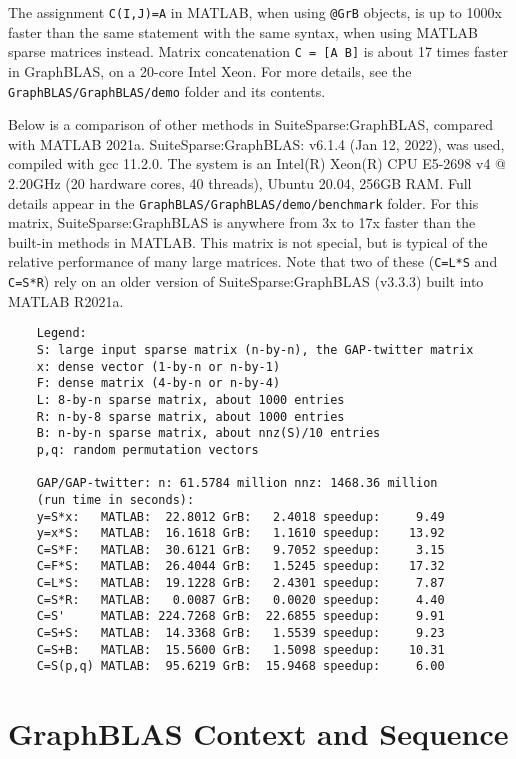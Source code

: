 \documentclass[12pt]{article}
\begin{document}
The assignment \verb'C(I,J)=A' in MATLAB, when using \verb'@GrB' objects, is up
to 1000x faster than the same statement with the same syntax, when using MATLAB
sparse matrices instead.  Matrix concatenation \verb'C = [A B]' is about 17
times faster in GraphBLAS, on a 20-core Intel Xeon.  For more details, see the
\verb'GraphBLAS/GraphBLAS/demo' folder and its contents.

Below is a comparison of other methods in SuiteSparse:GraphBLAS, compared with
MATLAB 2021a.  SuiteSparse:GraphBLAS: v6.1.4 (Jan 12, 2022), was used, compiled
with gcc 11.2.0.  The system is an Intel(R) Xeon(R) CPU E5-2698 v4 @ 2.20GHz
(20 hardware cores, 40 threads), Ubuntu 20.04, 256GB RAM.  Full details appear
in the \verb'GraphBLAS/GraphBLAS/demo/benchmark' folder.  For this matrix,
SuiteSparse:GraphBLAS is anywhere from 3x to 17x faster than the built-in
methods in MATLAB.  This matrix is not special, but is typical of the relative
performance of many large matrices.  Note that two of these (\verb'C=L*S' and
\verb'C=S*R') rely on an older version of SuiteSparse:GraphBLAS (v3.3.3) built
into MATLAB R2021a.

{\footnotesize
\begin{verbatim}
    Legend:
    S: large input sparse matrix (n-by-n), the GAP-twitter matrix
    x: dense vector (1-by-n or n-by-1)
    F: dense matrix (4-by-n or n-by-4)
    L: 8-by-n sparse matrix, about 1000 entries
    R: n-by-8 sparse matrix, about 1000 entries
    B: n-by-n sparse matrix, about nnz(S)/10 entries
    p,q: random permutation vectors

    GAP/GAP-twitter: n: 61.5784 million nnz: 1468.36 million
    (run time in seconds):
    y=S*x:   MATLAB:  22.8012 GrB:   2.4018 speedup:     9.49
    y=x*S:   MATLAB:  16.1618 GrB:   1.1610 speedup:    13.92
    C=S*F:   MATLAB:  30.6121 GrB:   9.7052 speedup:     3.15
    C=F*S:   MATLAB:  26.4044 GrB:   1.5245 speedup:    17.32
    C=L*S:   MATLAB:  19.1228 GrB:   2.4301 speedup:     7.87
    C=S*R:   MATLAB:   0.0087 GrB:   0.0020 speedup:     4.40
    C=S'     MATLAB: 224.7268 GrB:  22.6855 speedup:     9.91
    C=S+S:   MATLAB:  14.3368 GrB:   1.5539 speedup:     9.23
    C=S+B:   MATLAB:  15.5600 GrB:   1.5098 speedup:    10.31
    C=S(p,q) MATLAB:  95.6219 GrB:  15.9468 speedup:     6.00    \end{verbatim}
}

\newpage
\section{GraphBLAS Context and Sequence} %
\label{context}
\end{document}
